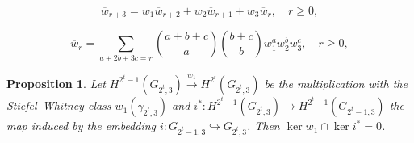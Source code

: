 \documentclass[10pt,a4paper]{amsart}
\newtheorem{proposition}{Proposition}
\begin{document}
\begin{equation}\label{w_rekurzivno}
    \overline w_{r+3} = w_1\overline w_{r+2} + w_2\overline w_{r+1} + w_3\overline w_r,\quad r\ge 0,
\end{equation}

\begin{equation}\label{overline_w}
    \overline w_r = \sum_{a+2b+3c = r} \binom{a+b+c}{a}\binom{b+c}{b} w_1^aw_2^bw_3^c,\quad r\ge 0,
\end{equation}

\begin{proposition}\label{kercapker2} Let $H^{2^t-1}(G_{2^t,3})\stackrel{w_1}\longrightarrow H^{2^t}(G_{2^t,3})$ be the multiplication with the Stiefel--Whitney class $w_1(\gamma_{2^t,3})$ and $i^*:H^{2^t-1}(G_{2^t,3})\rightarrow H^{2^t-1}(G_{2^t-1,3})$ the map induced by the embedding $i:G_{2^t-1,3}\hookrightarrow G_{2^t,3}$. Then
    $\ker w_1\cap \ker i^* = 0$.
\end{proposition}
\end{document}
